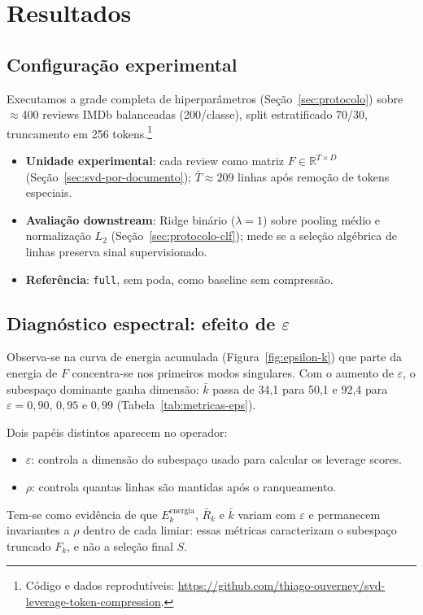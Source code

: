 \section{Resultados}\label{sec:resultados}

\subsection{Configuração experimental}

Executamos a grade completa de hiperparâmetros (Seção~\ref{sec:protocolo}) sobre $\approx$400 reviews IMDb balanceadas (200/classe), split estratificado 70/30, truncamento em 256 tokens.\footnote{Código e dados reprodutíveis: \url{https://github.com/thiago-ouverney/svd-leverage-token-compression}.}
\begin{itemize}
    \item \textbf{Unidade experimental}: cada review como matriz $F \in \mathbb{R}^{T \times D}$ (Seção~\ref{sec:svd-por-documento}); $\bar{T}\approx 209$ linhas após remoção de tokens especiais.
    \item \textbf{Avaliação downstream}: Ridge binário ($\lambda=1$) sobre pooling médio e normalização $L_2$ (Seção~\ref{sec:protocolo-clf}); mede se a seleção algébrica de linhas preserva sinal supervisionado.
    \item \textbf{Referência}: \texttt{full}, sem poda, como baseline sem compressão.
\end{itemize}

\subsection{Diagnóstico espectral: efeito de $\varepsilon$}

Observa-se na curva de energia acumulada (Figura~\ref{fig:epsilon-k}) que parte da energia de $F$ concentra-se nos primeiros modos singulares. Com o aumento de $\varepsilon$, o subespaço dominante ganha dimensão: $\bar{k}$ passa de 34,1 para 50,1 e 92,4 para $\varepsilon=0{,}90$, $0{,}95$ e $0{,}99$ (Tabela~\ref{tab:metricas-eps}).

Dois papéis distintos aparecem no operador:
\begin{itemize}
    \item \textbf{$\varepsilon$}: controla a dimensão do subespaço usado para calcular os leverage scores.
    \item \textbf{$\rho$}: controla quantas linhas são mantidas após o ranqueamento.
\end{itemize}
Tem-se como evidência de que $E_k^{\mathrm{energia}}$, $\bar{R}_k$ e $\bar{k}$ variam com $\varepsilon$ e permanecem invariantes a $\rho$ dentro de cada limiar: essas métricas caracterizam o subespaço truncado $F_k$, e não a seleção final $S$.

